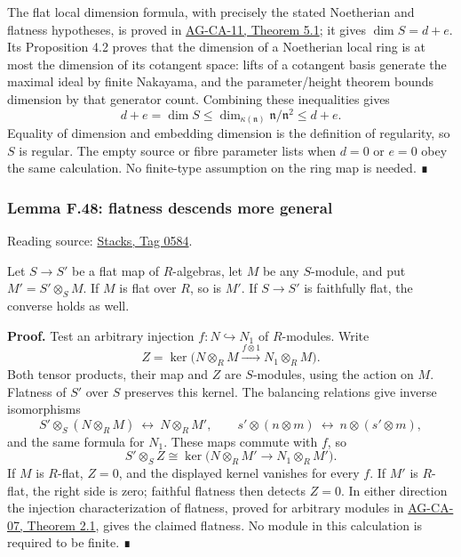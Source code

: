 \documentclass[11pt,a4paper,openany]{report}
\begin{document}
The flat local dimension formula, with precisely the stated Noetherian and flatness hypotheses, is proved in \href{https://github.com/KokunoYumeto/open-math-courses/blob/d02d0a3669f42579db037cd44de1d113fdd770a1/docs/courses/AG-CA/src/dimension-theory-of-noetherian-local-rings.md}{AG-CA-11, Theorem 5.1}; it gives \(\dim S=d+e\). Its Proposition 4.2 proves that the dimension of a Noetherian local ring is at most the dimension of its cotangent space: lifts of a cotangent basis generate the maximal ideal by finite Nakayama, and the parameter/height theorem bounds dimension by that generator count. Combining these inequalities gives \[
d+e=\dim S\leq
\dim_{\kappa(\mathfrak n)}\mathfrak n/\mathfrak n^2
\leq d+e.
\] Equality of dimension and embedding dimension is the definition of regularity, so \(S\) is regular. The empty source or fibre parameter lists when \(d=0\) or \(e=0\) obey the same calculation. No finite-type assumption on the ring map is needed. ∎

\label{AG-RG-S05-algebra-lemma-flatness-descends-more-general}

\subsubsection{Lemma F.48: flatness descends more general}\label{AG-RG-S05-lemma-f.48-flatness-descends-more-general}

Reading source: \href{https://stacks.math.columbia.edu/tag/0584}{Stacks, Tag 0584}.

Let \(S\to S'\) be a flat map of \(R\)-algebras, let \(M\) be any \(S\)-module, and put \(M'=S'\otimes_S M\). If \(M\) is flat over \(R\), so is \(M'\). If \(S\to S'\) is faithfully flat, the converse holds as well.

\textbf{Proof.} Test an arbitrary injection \(f:N\hookrightarrow N_1\) of \(R\)-modules. Write \[
Z=\ker\bigl(N\otimes_R M\xrightarrow{f\otimes1}N_1\otimes_R M\bigr).
\] Both tensor products, their map and \(Z\) are \(S\)-modules, using the action on \(M\). Flatness of \(S'\) over \(S\) preserves this kernel. The balancing relations give inverse isomorphisms \[
S'\otimes_S(N\otimes_R M)\ \longleftrightarrow\ N\otimes_R M',
\qquad s'\otimes(n\otimes m)\ \longleftrightarrow\ n\otimes(s'\otimes m),
\] and the same formula for \(N_1\). These maps commute with \(f\), so \[
S'\otimes_S Z\cong
\ker\bigl(N\otimes_R M'\longrightarrow N_1\otimes_R M'\bigr).
\] If \(M\) is \(R\)-flat, \(Z=0\), and the displayed kernel vanishes for every \(f\). If \(M'\) is \(R\)-flat, the right side is zero; faithful flatness then detects \(Z=0\). In either direction the injection characterization of flatness, proved for arbitrary modules in \href{https://github.com/KokunoYumeto/open-math-courses/blob/d02d0a3669f42579db037cd44de1d113fdd770a1/docs/courses/AG-CA/src/tor-and-flat-modules.md}{AG-CA-07, Theorem 2.1}, gives the claimed flatness. No module in this calculation is required to be finite. ∎
\end{document}
